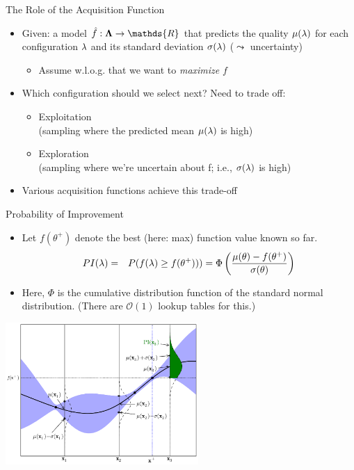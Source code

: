 \begin{frame}[c,fragile]{The Role of the Acquisition Function}
\begin{itemize}
  \item Given: a model $\hat{f}:\confs \rightarrow \mathds{R}$ that predicts the quality $\mu(\mathbf{\lambda})$ for each configuration $\mathbf{\lambda}$ and its standard deviation $\sigma(\mathbf{\lambda})$ ($\leadsto$ uncertainty)
  \begin{itemize}
  	\item Assume w.l.o.g. that we want to \emph{maximize} $f$
  \end{itemize}
  \medskip
  \pause
  \item Which configuration should we select next? Need to trade off: 
  \begin{itemize}
    \item \alert{Exploitation}\\(sampling where the predicted mean $\mu(\mathbf{\lambda})$ is high)
    \item \alert{Exploration}\\(sampling where we're uncertain about f; i.e., $\sigma(\mathbf{\lambda})$ is high)
  \end{itemize}
  \medskip
  \pause
  \item Various acquisition functions achieve this trade-off
\end{itemize}

\end{frame}


\begin{frame}[c,fragile]{Probability of Improvement}
\begin{itemize}
\vspace*{-0.2cm}
  \item Let $f(\theta^+)$ denote the best (here: max) function value known so far.
\vspace*{-0.2cm}  
  \begin{eqnarray}
\nonumber{}  PI(\mathbf{\lambda}) & = & P(f(\mathbf{\lambda}) \ge f(\theta^+))) = \Phi \left( \frac{\mu(\theta) - f(\theta^+)}{\sigma(\theta)} \right)
  \end{eqnarray}
  \item Here, $\Phi$ is the cumulative distribution function of the standard normal distribution. (There are $\mathcal{O}(1)$ lookup tables for this.)
\end{itemize}
\centering
\includegraphics[width=0.55\textwidth]{images/Acquisition-PI.png} 

\end{frame}

